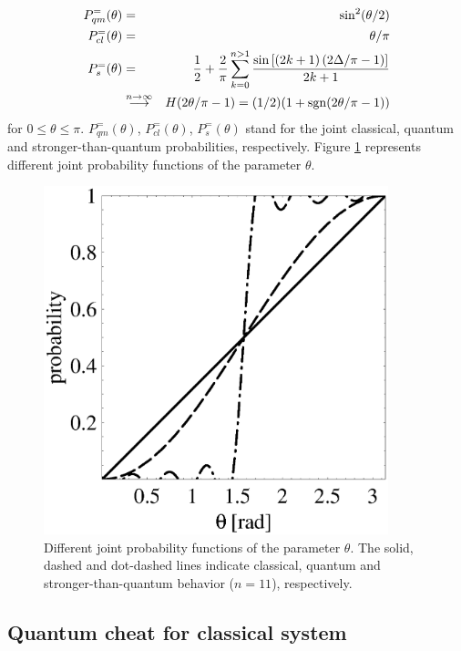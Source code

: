 \begin{eqnarray}
P^{=}_{qm} (\theta )&=&\sin^2 (\theta /2)\\
P^{=}_{cl} (\theta ) &=& \theta /\pi       \\
P^{=}_{s} (\theta ) &=&
{1\over 2}
+
{2\over \pi}
\sum_{k=0}^{n>1}
{
\sin \left[(2k+1)\left({2\Delta/ \pi}-1\right) \right]
\over 2k+1}
\nonumber \\
&\stackrel{n\rightarrow \infty}{\longrightarrow}& H(2\theta /\pi -1)=(1/2)(1+{\rm sgn} (2\theta /\pi
-1))
\end{eqnarray}
for $0\le \theta \le \pi$.
$P^{=}_{qm} (\theta )$,
$P^{=}_{cl} (\theta ) $,
$P^{=}_{s} (\theta ) $ stand for the joint classical, quantum and
stronger-than-quantum probabilities, respectively.
Figure   \ref{2001-cheat-fprob} represents different joint probability functions of the  parameter $\theta$.
\begin{figure}
\begin{center}
 \includegraphics[width=10cm]{2001-cesena-f1.eps}
\end{center}
 \caption{
Different joint probability functions of the  parameter $\theta$.
The solid, dashed and dot-dashed lines indicate classical, quantum and
stronger-than-quantum behavior ($n=11$), respectively.
}
\label{2001-cheat-fprob}
\end{figure}



\subsection{Quantum cheat for classical system}

